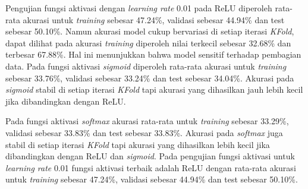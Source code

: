     Pengujian fungsi aktivasi dengan \textit{learning rate} 0.01 
    pada ReLU diperoleh rata-rata akurasi untuk \textit{training} sebesar 47.24\%, validasi sebesar 44.94\% dan test sebesar 50.10\%. Namun akurasi model cukup bervariasi di setiap iterasi \textit{KFold}, dapat dilihat pada akurasi \textit{training} diperoleh nilai terkecil sebesar 32.68\% dan terbesar 67.88\%.
    Hal ini menunjukkan bahwa model sensitif terhadap pembagian data. Pada fungsi aktivasi \textit{sigmoid} diperoleh rata-rata akurasi untuk \textit{training} sebesar 33.76\%, validasi sebesar 33.24\% dan test sebesar 34.04\%. Akurasi pada \textit{sigmoid} stabil di setiap iterasi \textit{KFold} tapi akurasi yang dihasilkan jauh lebih kecil jika dibandingkan dengan ReLU.
    
    Pada fungsi aktivasi \textit{softmax} akurasi rata-rata untuk \textit{training} sebesar 33.29\%, validasi sebesar 33.83\% dan test sebesar 33.83\%. Akurasi pada \textit{softmax} juga stabil di setiap iterasi \textit{KFold} tapi akurasi yang dihasilkan lebih kecil jika dibandingkan dengan ReLU dan \textit{sigmoid}. Pada pengujian fungsi aktivasi untuk \textit{learning rate} 0.01 fungsi aktivasi terbaik adalah ReLU dengan rata-rata akurasi untuk \textit{training} sebesar 47.24\%, validasi sebesar 44.94\% dan test sebesar 50.10\%.

    

